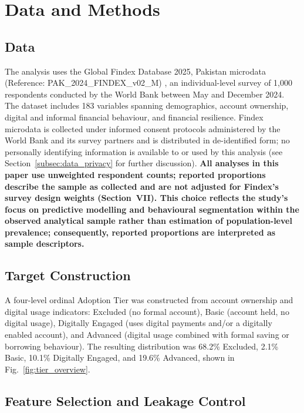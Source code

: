 \documentclass[conference]{IEEEtran}
\begin{document}
\section{Data and Methods}
\label{sec:data_and_methods}
 
\subsection{Data}
\label{subsec:data}
The analysis uses the Global Findex Database 2025, Pakistan microdata (Reference: PAK\_2024\_FINDEX\_v02\_M) \cite{worldbank2025}, an individual-level survey of 1{,}000 respondents conducted by the World Bank between May and December 2024. The dataset includes 183 variables spanning demographics, account ownership, digital and informal financial behaviour, and financial resilience. Findex microdata is collected under informed consent protocols administered by the World Bank and its survey partners and is distributed in de-identified form; no personally identifying information is available to or used by this analysis (see Section~\ref{subsec:data_privacy} for further discussion). \textbf{All
analyses in this paper use unweighted respondent counts; reported
proportions describe the sample as collected and are not adjusted for
Findex's survey design weights (Section~VII). This choice reflects the study's focus on predictive modelling and behavioural segmentation within the observed analytical sample rather than estimation of population-level prevalence; consequently, reported proportions are interpreted as sample descriptors.}

 
\subsection{Target Construction}
\label{subsec:target_construction}
A four-level ordinal Adoption Tier was constructed from account ownership and digital usage indicators: Excluded (no formal account), Basic (account held, no digital usage), Digitally Engaged (uses digital payments and/or a digitally enabled account), and Advanced (digital usage combined with formal saving or borrowing behaviour). The resulting distribution was 68.2\% Excluded, 2.1\% Basic, 10.1\% Digitally Engaged, and 19.6\% Advanced, shown in Fig.~\ref{fig:tier_overview}.
 
\subsection{Feature Selection and Leakage Control}
\label{subsec:feature_selection_leakage_control}
\end{document}
